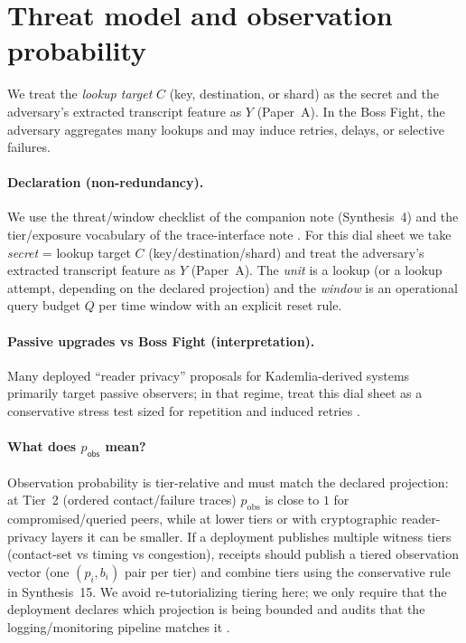 \documentclass[11pt]{article}
\begin{document}


\section{Threat model and observation probability}\label{sec:pobs}
We treat the \emph{lookup target} $C$ (key, destination, or shard) as the secret and the adversary's extracted transcript feature as $Y$ (Paper~A).
In the Boss Fight, the adversary aggregates many lookups and may induce retries, delays, or selective failures.

\paragraph{Declaration (non-redundancy).}
We use the threat/window checklist of the companion note (Synthesis~4) \cite{series:threatwindows} and the tier/exposure vocabulary of the trace-interface note \cite{series:traceifaces}.
For this dial sheet we take \emph{secret} = lookup target $C$ (key/destination/shard) and treat the adversary's extracted transcript feature as $Y$ (Paper~A).
The \emph{unit} is a lookup (or a lookup attempt, depending on the declared projection) and the \emph{window} is an operational query budget $Q$ per time window with an explicit reset rule.


\paragraph{Passive upgrades vs Boss Fight (interpretation).}
Many deployed ``reader privacy'' proposals for Kademlia-derived systems primarily target passive observers; in that regime, treat this dial sheet as a conservative stress test sized for repetition and induced retries \cite{daniel2025queryobfuscation}.


\paragraph{What does $p_{\mathsf{obs}}$ mean?}
Observation probability is tier-relative and must match the declared projection: at Tier~2 (ordered contact/failure traces) $p_{\mathrm{obs}}$ is close to $1$ for compromised/queried peers, while at lower tiers or with cryptographic reader-privacy layers it can be smaller. If a deployment publishes multiple witness tiers (contact-set vs timing vs congestion), receipts should publish a tiered observation vector (one $(p_i,b_i)$ pair per tier) and combine tiers using the conservative rule in Synthesis~15.\cite{series:tieredobs}
We avoid re-tutorializing tiering here; we only require that the deployment declares which projection is being bounded and audits that the logging/monitoring pipeline matches it \cite{series:traceifaces,series:threatwindows}.
\end{document}
